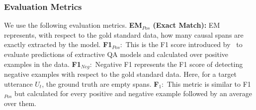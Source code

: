 \documentclass[smallextended]{svjour3}
\newcommand\0{\hphantom{0}}
\begin{document}
\subsubsection{Evaluation Metrics}
\label{sec:metric}


We use the following evaluation metrics.
\textbf{EM$_{Pos}$ (Exact Match):} EM represents, with respect to the gold standard data, how many causal spans are exactly extracted by the model.
\textbf{F1$_{Pos}$}:~This is the F1 score introduced by~\citet{rajpurkar2016squad} to evaluate predictions of extractive QA models and calculated over positive examples in the data.
\textbf{F1$_{Neg}$}:~Negative F1 represents the F1 score of detecting negative examples with respect to the gold standard data. Here, for a target utterance $U_t$, the ground truth are empty spans.
\textbf{F$_1$}:~This metric is similar to F1$_{Pos}$ but calculated for every positive and negative example followed by an average over them.
\end{document}

